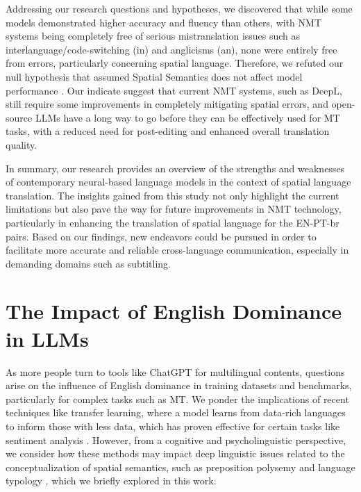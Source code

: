Addressing our research questions and hypotheses, we discovered that while some models demonstrated higher accuracy and fluency than others, with NMT systems being completely free of serious mistranslation issues such as interlanguage/code-switching (in) and anglicisms (an), none were entirely free from errors, particularly concerning spatial language. Therefore, we refuted our null hypothesis that assumed Spatial Semantics does not affect model performance%
. Our indicate suggest that current NMT systems, such as DeepL, still require some improvements in completely mitigating spatial errors, and open-source LLMs have a long way to go before they can be effectively used for MT tasks, with a reduced need for post-editing and enhanced overall translation quality.

In summary, our research provides an %
overview of the strengths and weaknesses of contemporary neural-based language models in the context of spatial language translation. The insights gained from this study not only highlight the current limitations but also pave the way for future improvements in NMT technology, particularly in enhancing the translation of spatial language for the EN-PT-br pairs. Based on our findings, new endeavors could be pursued in order to facilitate more accurate and reliable cross-language communication, especially in demanding domains such as subtitling.


\section{The Impact of English Dominance in LLMs} 

As more people turn to tools like ChatGPT for multilingual contents, questions arise on %
the influence of English dominance in training datasets and benchmarks, particularly for complex tasks such as MT. We ponder the implications of recent %
techniques like transfer learning, where a model learns from data-rich languages to inform those with less data, which has proven effective for certain tasks like sentiment analysis \parencite{negi-etal-2024-hybrid-approach}. However, from a cognitive and psycholinguistic perspective, we consider how these methods may impact deep linguistic issues related to the conceptualization of spatial semantics, such as preposition polysemy and language typology \parencite{herskovits1986language, talmy2000toward, talmy2000towardb, slobin2005relating}, which we briefly explored in this work.

